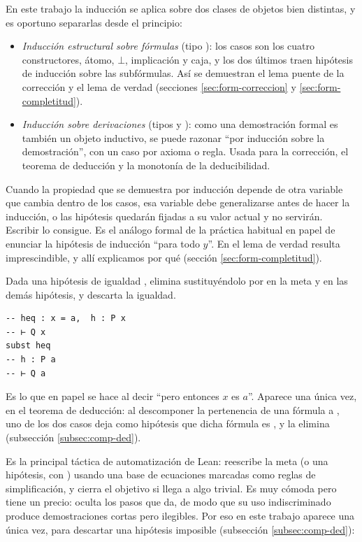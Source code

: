 En este trabajo la inducción se aplica sobre dos clases de objetos bien distintas, y es oportuno separarlas desde el principio:

\begin{itemize}
  \item \emph{Inducción estructural sobre fórmulas} (tipo ): los casos son los cuatro constructores, átomo, $\bot$, implicación y caja, y los dos últimos traen hipótesis de inducción sobre las subfórmulas. Así se demuestran el lema puente de la corrección y el lema de verdad (secciones \ref{sec:form-correccion} y \ref{sec:form-completitud}).
  \item \emph{Inducción sobre derivaciones} (tipos  y ): como una demostración formal es también un objeto inductivo, se puede razonar ``por inducción sobre la demostración'', con un caso por axioma o regla. Usada para la corrección, el teorema de deducción y la monotonía de la deducibilidad.
\end{itemize}

 Cuando la propiedad que se demuestra por inducción depende de otra variable que cambia dentro de los casos, esa variable debe generalizarse antes de hacer la inducción, o las hipótesis quedarán fijadas a su valor actual y no servirán. Escribir  lo consigue. Es el análogo formal de la práctica habitual en papel de enunciar la hipótesis de inducción ``para todo $y$''. En el lema de verdad resulta imprescindible, y allí explicamos por qué (sección \ref{sec:form-completitud}).

 Dada una hipótesis de igualdad , elimina  sustituyéndolo por  en la meta y en las demás hipótesis, y descarta la igualdad.

\begin{lstlisting}
-- heq : x = a,  h : P x
-- ⊢ Q x
subst heq
-- h : P a
-- ⊢ Q a
\end{lstlisting}

Es lo que en papel se hace al decir ``pero entonces $x$ es $a$''. Aparece una única vez, en el teorema de deducción: al descomponer la pertenencia de una fórmula a , uno de los dos casos deja como hipótesis que dicha fórmula es , y  la elimina (subsección \ref{subsec:comp-ded}).

 Es la principal táctica de automatización de Lean: reescribe la meta (o una hipótesis, con ) usando una base de ecuaciones marcadas como reglas de simplificación, y cierra el objetivo si llega a algo trivial. Es muy cómoda pero tiene un precio: oculta los pasos que da, de modo que su uso indiscriminado produce demostraciones cortas pero ilegibles. Por eso en este trabajo aparece una única vez, para descartar una hipótesis imposible (subsección \ref{subsec:comp-ded}):

